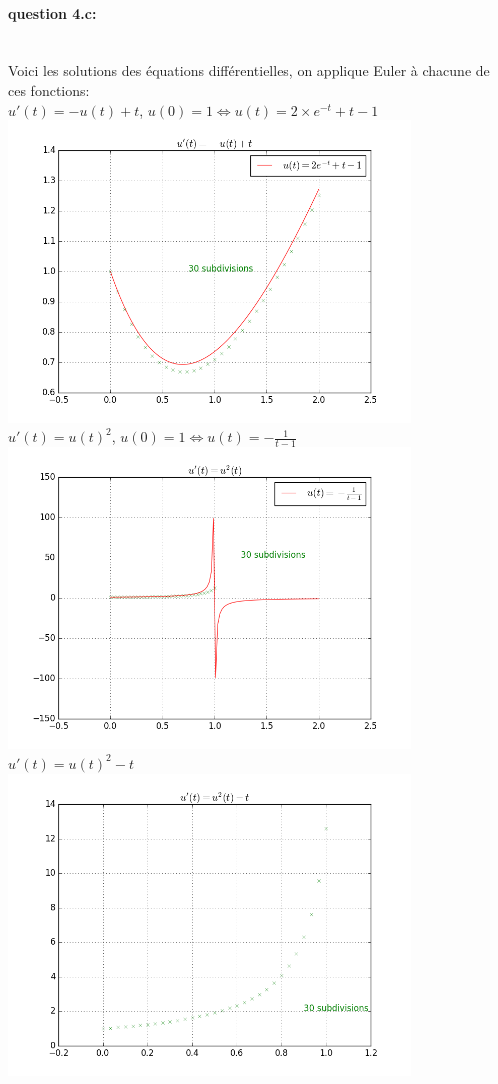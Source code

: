 \documentclass{article}
\begin{document}
\paragraph{question 4.c:}
~~\\
Voici les solutions des équations différentielles, on applique Euler à chacune de ces fonctions:
\\
$u'(t)=-u(t)+t$, $u(0)=1 \iff u(t)=2\times{e^{-t}+t-1}$
\\
\includegraphics[height=8cm]{u2_30.png}
\\
$u'(t)= u(t)^2$, $u(0)=1 \iff u(t)=-\frac{1}{t-1}$
\\
\includegraphics[height=8cm]{u3_30.png}
\\
$u'(t)=u(t)^2-t$
\\
\includegraphics[height=8cm]{u4_30.png}
\\
\end{document}
